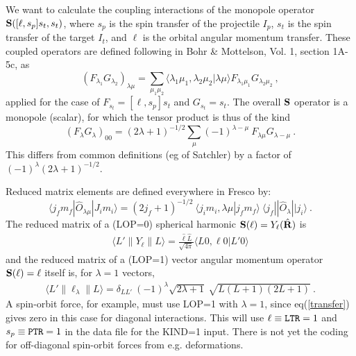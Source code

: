 \documentclass[11pt]{article}
\begin{document}
\bigskip

We want to calculate the coupling interactions of the monopole operator
$   {\bf S}([\ell,s_p]s_t,s_t)  $, where $s_p$ is the spin transfer of the
projectile $I_p$,  $s_t$ is the spin transfer of the
target $I_t$, and $\ell$ is the orbital angular momentum transfer.
These coupled operators are defined following in Bohr \& Mottelson, Vol.
1, section 1A-5c, as
\begin{equation}
(F_{\lambda_1} G_{\lambda_2})_{\lambda \mu}
  = \sum_{\mu_1 \mu_2} \langle \lambda_1 \mu_1 ,  \lambda_2 \mu_2
  |  \lambda \mu \rangle F_{\lambda_1\mu_1} G_{\lambda_2\mu_2} \ ,
\end{equation}
applied for the case of $F_{s_t} = [\ell,s_p]s_t$ and $ G_{s_t}=s_t$.
The overall ${\bf S}$ operator is a monopole (scalar), for which the tensor
product is thus of the kind
\begin{equation}
(F_{\lambda} G_{\lambda})_{00}
  = (2\lambda+1)^{-1/2} \sum_{\mu} (-1)^{\lambda-\mu} ~ F_{\lambda\mu}
  G_{\lambda-\mu} \ .
\end{equation}
This differs from common definitions (eg of Satchler) by a factor of
$ (-1)^\lambda (2\lambda+1)^{-1/2} $.

\bigskip

Reduced matrix elements are defined everywhere in {\sc Fresco} by:
\begin{equation}
\langle j_f m_f | \hat{O}_{\lambda \mu} | J_i m_i \rangle
 = (2j_f+1)^{-1/2} ~ \langle j_i m_i ,\lambda \mu | j_f m_f \rangle ~
\langle j_f || \hat{O}_\lambda || j_i\rangle \ .
\end{equation}
%
The reduced matrix of a (LOP=0)  spherical harmonic  ${\bf S}(\ell) = Y_\ell (\hat{\bf R})$ is
\begin{eqnarray}
\langle L' \parallel Y_\ell  \parallel L \rangle = 
\frac{\hat{\ell}\hat{L}}{\sqrt{4\pi}}  \langle L 0, \ell 0 | L' 0 \rangle   \label{transfer}
\end{eqnarray}
and the reduced matrix of a (LOP=1) vector angular momentum operator  ${\bf S}(\ell) = {\bf \ell}$ itself is, for $\lambda=1$ vectors, 
\begin{eqnarray}
\langle L' \parallel  \ell_\lambda  \parallel L \rangle = \delta_{LL'} ~ (-1)^\lambda \sqrt{2\lambda+1} ~ \sqrt{ L  (L+1) (2L+1) }  \ .
  \label{operator}
\end{eqnarray}
A spin-orbit force, for example, must use LOP=1 with $\lambda=1$, since eq(\ref{transfer}) gives zero in this case for diagonal interactions.  
This will use $\ell \equiv {\tt LTR} = 1$  and   $s_p \equiv {\tt PTR} = 1$ in the data file for the KIND=1 input.  There is not yet the coding for off-diagonal spin-orbit forces from e.g. deformations.
\end{document}
